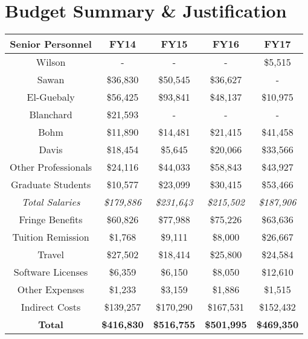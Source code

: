 \chapter{Budget Summary \& Justification}


\begin{tabular}{|c|c|c|c|c|}\hline
  Senior Personnel & FY14 & FY15 & FY16 & FY17 \\\hline\hline
  Wilson     & - & - & - & \$5,515 \\\hline
  Sawan      & \$36,830 & \$50,545 & \$36,627 & - \\\hline
  El-Guebaly & \$56,425 & \$93,841 & \$48,137 & \$10,975 \\\hline
  Blanchard  & \$21,593 & - & - & - \\\hline
  Bohm       & \$11,890 & \$14,481 & \$21,415 & \$41,458 \\\hline
  Davis      & \$18,454 & \$5,645 & \$20,066 & \$33,566 \\\hline\hline
  Other Professionals & \$24,116 & \$44,033 & \$58,843 & \$43,927 \\\hline\hline
  Graduate Students & \$10,577 & \$23,099 & \$30,415 & \$53,466 \\\hline\hline
  \emph{Total Salaries} & \emph{\$179,886} & \emph{\$231,643} & \emph{\$215,502} & \emph{\$187,906} \\\hline\hline
  Fringe Benefits & \$60,826 & \$77,988 & \$75,226 & \$63,636 \\\hline\hline
  Tuition Remission &  \$1,768 & \$9,111 & \$8,000 & \$26,667 \\\hline\hline
  Travel & \$27,502 & \$18,414 & \$25,800 & \$24,584 \\\hline\hline
  Software Licenses & \$6,359 & \$6,150 & \$8,050 & \$12,610 \\\hline\hline
  Other Expenses & \$1,233 & \$3,159 & \$1,886 & \$1,515 \\\hline\hline
  Indirect Costs & \$139,257 & \$170,290 & \$167,531 & \$152,432 \\\hline\hline
  \textbf{Total} & \textbf{\$416,830} & \textbf{\$516,755} & \textbf{\$501,995} & \textbf{\$469,350} \\\hline
\end{tabular}
  
